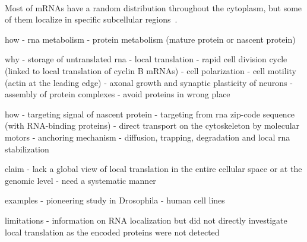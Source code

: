 ~\cite{Blower_2013}
~\cite{Bovaird_2018}
~\cite{Eliscovich_2017}
~\cite{Jung_2014}
~\cite{pichon_kinesin_2021}
~\cite{pichon_kinesin_2021}
~\cite{pichon_kinesin_2021}
~\cite{pichon_kinesin_2021}
~\cite{pichon_kinesin_2021}

Most of \ac{mRNA}s have a random distribution throughout the cytoplasm, but some of them localize in specific subcellular regions~\cite{Blower_2013, Jung_2014, Eliscovich_2017, Bovaird_2018}.


how
- rna metabolism
- protein metabolism (mature protein or nascent protein)

why
- storage of untranslated rna
- local translation
- rapid cell division cycle (linked to local translation of cyclin B mRNAs)
- cell polarization
- cell motility (actin at the leading edge)
- axonal growth and synaptic plasticity of neurons
- assembly of protein complexes
- avoid proteins in wrong place

how
- targeting signal of nascent protein
- targeting from rna zip-code sequence (with RNA-binding proteins)
- direct transport on the cytoskeleton by molecular motors
- anchoring mechanism
- diffusion, trapping, degradation and local rna stabilization

claim
- lack a global view of local translation in the entire cellular space or at the genomic level
- need a systematic manner

examples
- pioneering study in Drosophila
- human cell lines

limitations
- information on RNA localization but did not directly investigate local translation as the encoded proteins were not detected




